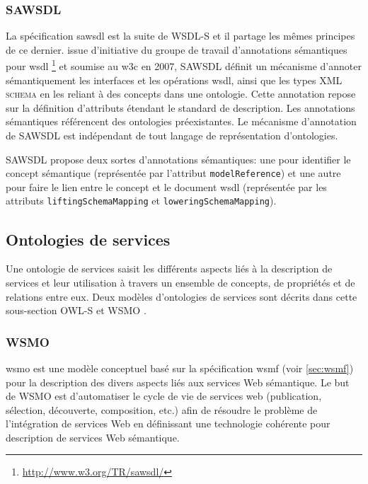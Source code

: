     \subsubsection{SAWSDL}
    La spécification \acrshort{sawsdl} \cite{kopecky2007sawsdl} est la
    suite de \textsc{WSDL-S} et il partage les mêmes principes de ce
    dernier. issue d'initiative du groupe de travail d'annotations
    sémantiques pour \acrshort{wsdl}
    \footnote{\url{http://www.w3.org/TR/sawsdl/}} et soumise au
    \acrshort{w3c} en 2007, \textsc{SAWSDL} définit un mécanisme
    d'annoter sémantiquement les interfaces et les opérations
    \acrshort{wsdl}, ainsi que les types \textsc{XML schema} en les
    reliant à des concepts dans une ontologie. Cette annotation repose
    sur la définition d'attributs étendant le standard de
    description. Les annotations sémantiques référencent des
    ontologies préexistantes. Le mécanisme d'annotation de
    \textsc{SAWSDL} est indépendant de tout langage de représentation
    \cite{lopez2008selection} d'ontologies.

    \textsc{SAWSDL} propose deux sortes d'annotations sémantiques: une
    pour identifier le concept sémantique (représentée par l'attribut
    \texttt{modelReference}) et une autre pour faire le lien entre le
    concept et le document \acrshort{wsdl} (représentée par les
    attributs \texttt{liftingSchemaMapping} et
    \texttt{loweringSchemaMapping}).

  \subsection{Ontologies de services}
  \label{sec:ont-services}

  Une ontologie de services saisit les différents aspects liés à la
  description de services et leur utilisation à travers un ensemble
  de concepts, de propriétés et de relations entre eux. Deux modèles
  d'ontologies de services sont décrits dans cette sous-section
  \textsc{OWL-S} et \textsc{WSMO} \cite{elie2010}.

    \subsubsection{WSMO}
    \label{sec:wsmo}

    \acrshort{wsmo} \cite{de2005web} est une modèle conceptuel basé
    sur la spécification \acrshort{wsmf} \cite{fensel2002web} (voir
    \ref{sec:wsmf}) pour la description des divers aspects liés aux
    services Web sémantique. Le but de \textsc{WSMO} est d'automatiser
    le cycle de vie de services web (publication, sélection,
    découverte, composition, etc.) afin de résoudre le problème de
    l'intégration de services Web en définissant une technologie
    cohérente pour description de services Web sémantique.


